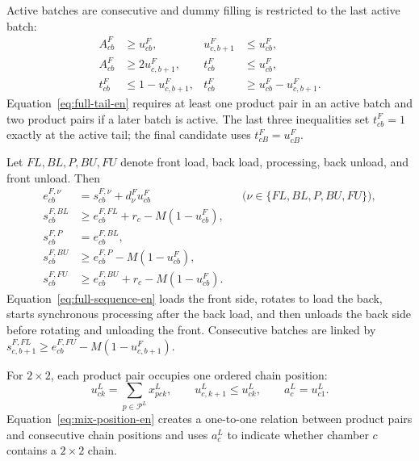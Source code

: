 \documentclass[final,5p,times,twocolumn]{elsarticle}
\begin{document}
Active batches are consecutive and dummy filling is restricted to the last active batch:
\begin{equation}
\begin{aligned}
A^F_{cb}&\ge u^F_{cb}, &u^F_{c,b+1}&\le u^F_{cb},\\
A^F_{cb}&\ge2u^F_{c,b+1},
&t^F_{cb}&\le u^F_{cb},\\
t^F_{cb}&\le1-u^F_{c,b+1},
&t^F_{cb}&\ge u^F_{cb}-u^F_{c,b+1}.
\end{aligned}
\label{eq:full-tail-en}
\end{equation}
Equation~\eqref{eq:full-tail-en} requires at least one product pair in an active batch and two product pairs if a later batch is active. The last three inequalities set $t^F_{cb}=1$ exactly at the active tail; the final candidate uses $t^F_{cB}=u^F_{cB}$.

Let $FL,BL,P,BU,FU$ denote front load, back load, processing, back unload, and front unload. Then
\begin{equation}
\begin{aligned}
e^{F,\nu}_{cb}&=s^{F,\nu}_{cb}+d^{F}_{\nu}u^F_{cb}
&&\bigl(\nu\in\{FL,BL,P,BU,FU\}\bigr),\\
s^{F,BL}_{cb}&\ge e^{F,FL}_{cb}+r_c-M(1-u^F_{cb}),\\
s^{F,P}_{cb}&=e^{F,BL}_{cb},\\
s^{F,BU}_{cb}&\ge e^{F,P}_{cb}-M(1-u^F_{cb}),\\
s^{F,FU}_{cb}&\ge e^{F,BU}_{cb}+r_c-M(1-u^F_{cb}).
\end{aligned}
\label{eq:full-sequence-en}
\end{equation}
Equation~\eqref{eq:full-sequence-en} loads the front side, rotates to load the back, starts synchronous processing after the back load, and then unloads the back side before rotating and unloading the front. Consecutive batches are linked by $s^{F,FL}_{c,b+1}\ge e^{F,FU}_{cb}-M(1-u^F_{c,b+1})$.

For $2\times2$, each product pair occupies one ordered chain position:
\begin{equation}
u^L_{ck}=\sum_{p\in\mathcal P^L}x^L_{pck},\qquad
u^L_{c,k+1}\le u^L_{ck},\qquad
a^L_c=u^L_{c1}.
\label{eq:mix-position-en}
\end{equation}
Equation~\eqref{eq:mix-position-en} creates a one-to-one relation between product pairs and consecutive chain positions and uses $a^L_c$ to indicate whether chamber $c$ contains a $2\times2$ chain.
\end{document}
